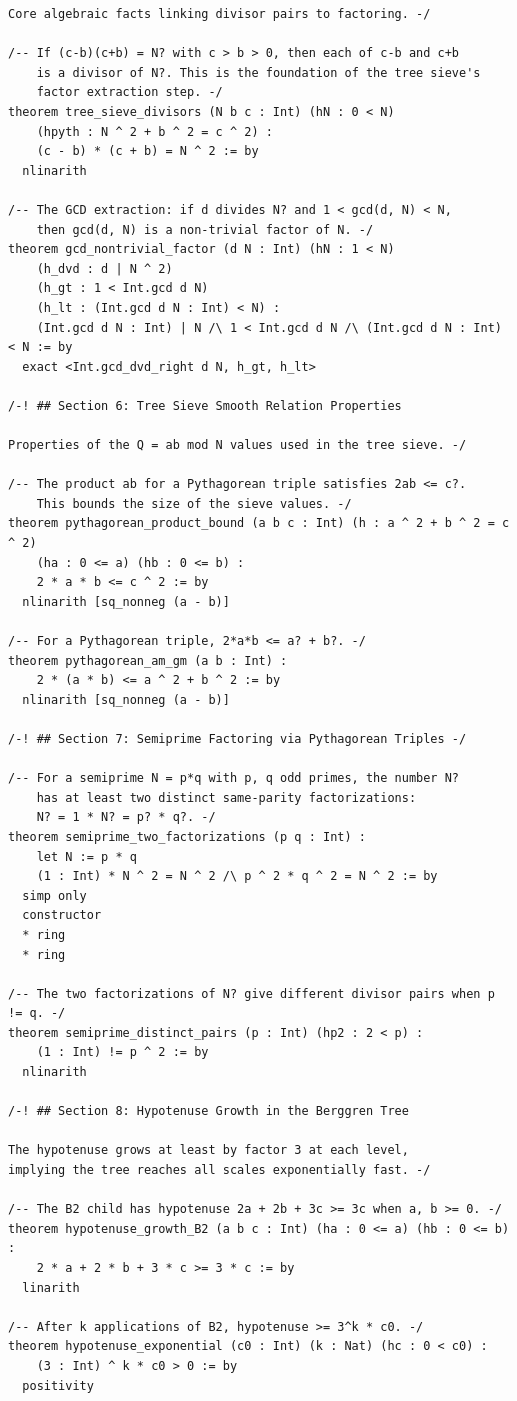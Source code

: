 \documentclass[11pt,twoside,openright]{book}
\theoremstyle{definition}
\theoremstyle{remark}
\begin{document}
\begin{lstlisting}[style=lean]
Core algebraic facts linking divisor pairs to factoring. -/

/-- If (c-b)(c+b) = N? with c > b > 0, then each of c-b and c+b
    is a divisor of N?. This is the foundation of the tree sieve's
    factor extraction step. -/
theorem tree_sieve_divisors (N b c : Int) (hN : 0 < N)
    (hpyth : N ^ 2 + b ^ 2 = c ^ 2) :
    (c - b) * (c + b) = N ^ 2 := by
  nlinarith

/-- The GCD extraction: if d divides N? and 1 < gcd(d, N) < N,
    then gcd(d, N) is a non-trivial factor of N. -/
theorem gcd_nontrivial_factor (d N : Int) (hN : 1 < N)
    (h_dvd : d | N ^ 2)
    (h_gt : 1 < Int.gcd d N)
    (h_lt : (Int.gcd d N : Int) < N) :
    (Int.gcd d N : Int) | N /\ 1 < Int.gcd d N /\ (Int.gcd d N : Int) < N := by
  exact <Int.gcd_dvd_right d N, h_gt, h_lt>

/-! ## Section 6: Tree Sieve Smooth Relation Properties

Properties of the Q = ab mod N values used in the tree sieve. -/

/-- The product ab for a Pythagorean triple satisfies 2ab <= c?.
    This bounds the size of the sieve values. -/
theorem pythagorean_product_bound (a b c : Int) (h : a ^ 2 + b ^ 2 = c ^ 2)
    (ha : 0 <= a) (hb : 0 <= b) :
    2 * a * b <= c ^ 2 := by
  nlinarith [sq_nonneg (a - b)]

/-- For a Pythagorean triple, 2*a*b <= a? + b?. -/
theorem pythagorean_am_gm (a b : Int) :
    2 * (a * b) <= a ^ 2 + b ^ 2 := by
  nlinarith [sq_nonneg (a - b)]

/-! ## Section 7: Semiprime Factoring via Pythagorean Triples -/

/-- For a semiprime N = p*q with p, q odd primes, the number N?
    has at least two distinct same-parity factorizations:
    N? = 1 * N? = p? * q?. -/
theorem semiprime_two_factorizations (p q : Int) :
    let N := p * q
    (1 : Int) * N ^ 2 = N ^ 2 /\ p ^ 2 * q ^ 2 = N ^ 2 := by
  simp only
  constructor
  * ring
  * ring

/-- The two factorizations of N? give different divisor pairs when p != q. -/
theorem semiprime_distinct_pairs (p : Int) (hp2 : 2 < p) :
    (1 : Int) != p ^ 2 := by
  nlinarith

/-! ## Section 8: Hypotenuse Growth in the Berggren Tree

The hypotenuse grows at least by factor 3 at each level,
implying the tree reaches all scales exponentially fast. -/

/-- The B2 child has hypotenuse 2a + 2b + 3c >= 3c when a, b >= 0. -/
theorem hypotenuse_growth_B2 (a b c : Int) (ha : 0 <= a) (hb : 0 <= b) :
    2 * a + 2 * b + 3 * c >= 3 * c := by
  linarith

/-- After k applications of B2, hypotenuse >= 3^k * c0. -/
theorem hypotenuse_exponential (c0 : Int) (k : Nat) (hc : 0 < c0) :
    (3 : Int) ^ k * c0 > 0 := by
  positivity

\end{lstlisting}
\end{document}
